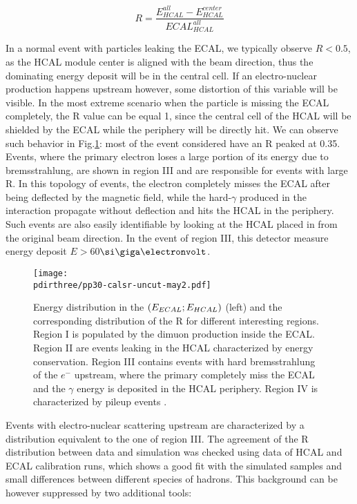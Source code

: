 \begin{equation}
  \label{eq:R-factor}
  R = \frac{E^{all}_{HCAL} - E^{center}_{HCAL}}{ECAL^{all}_{HCAL}}
\end{equation}

In a normal event with particles leaking the ECAL, we typically observe $R<0.5$, as the HCAL module center is aligned with the beam direction, thus the dominating energy deposit will be in the central cell. If an electro-nuclear production happens upstream however, some distortion of this variable will be visible. In the most extreme scenario when the particle is missing the ECAL completely, the R value can be equal 1, since the central cell of the HCAL will be shielded by the ECAL while the periphery will be directly hit. We can observe such behavior in Fig.\ref{fig:r-value-csample}: most of the event considered have an R peaked at 0.35. Events, where the primary electron loses a large portion of its energy due to bremsstrahlung, are shown in region III and are responsible for events with large R. In this topology of events, the electron completely misses the ECAL after being deflected by the magnetic field, while the hard-$\gamma$ produced in the interaction propagate without deflection and hits the HCAL in the periphery. Such events are also easily identifiable by looking at the HCAL placed in from the original beam direction. In the event of region III, this detector measure energy deposit $E>60$$\gev$.

\begin{figure}[bth!]
  \centering
  \texttt{[image: \\pdirthree/pp30-calsr-uncut-may2.pdf]}
  \caption[R value for control sample]{Energy distribution in the $(E_{ECAL};E_{HCAL})$ (left) and the corresponding distribution of the R for different interesting regions. Region I is populated by the dimuon production inside the ECAL. Region II are events leaking in the HCAL characterized by energy conservation. Region III contains events with hard bremsstrahlung of the $e^-$ upstream, where the primary completely miss the ECAL and the $\gamma$ energy is deposited in the HCAL periphery. Region IV is characterized by pileup events \cite{pdegen-thesis}.}
  \label{fig:r-value-csample}
\end{figure}

Events with electro-nuclear scattering upstream are characterized by a distribution equivalent to the one of region III. The agreement of the R distribution between data and simulation was checked using data of HCAL and ECAL calibration runs, which shows a good fit with the simulated samples and small differences between different species of hadrons. This background can be however suppressed by two additional tools:

